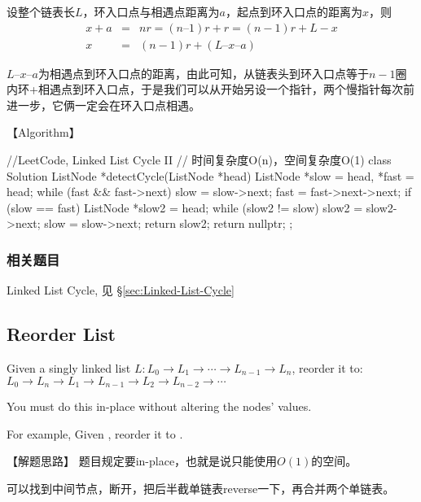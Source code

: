 设整个链表长$L$，环入口点与相遇点距离为$a$，起点到环入口点的距离为$x$，则
\begin{eqnarray}
	x + a &=& nr = (n – 1)r +r = (n-1)r + L - x \nonumber \\
	x &=& (n-1)r + (L – x – a) \nonumber
\end{eqnarray}

$L – x –
a$为相遇点到环入口点的距离，由此可知，从链表头到环入口点等于$n-1$圈内环+相遇点到环入口点，于是我们可以从开始另设一个指针，两个慢指针每次前进一步，它俩一定会在环入口点相遇。

【Algorithm】
\begin{Code}
	//LeetCode, Linked List Cycle II
	// 时间复杂度O(n)，空间复杂度O(1)
	class Solution {
		ListNode *detectCycle(ListNode *head) {
			ListNode *slow = head, *fast = head;
			while (fast && fast->next) {
				slow = slow->next;
				fast = fast->next->next;
				if (slow == fast) {
					ListNode *slow2 = head;
					while (slow2 != slow) {
						slow2 = slow2->next;
						slow = slow->next;
					}
					return slow2;
				}
			}
			return nullptr;
		}
	};
\end{Code}


\subsubsection{相关题目}
\begindot
\item Linked List Cycle, 见 \S \ref{sec:Linked-List-Cycle}
\myenddot


\subsection{Reorder List}
\label{sec:Reorder-List}



Given a singly linked list $L: L_0 \rightarrow L_1 \rightarrow \cdots
\rightarrow L_{n-1} \rightarrow L_n$,
reorder it to: $L_0 \rightarrow L_n \rightarrow L_1 \rightarrow L_{n-1}
\rightarrow L_2 \rightarrow L_{n-2} \rightarrow \cdots$

You must do this in-place without altering the nodes' values.

For example,
Given , reorder it to .


【解题思路】
题目规定要in-place，也就是说只能使用$O(1)$的空间。

可以找到中间节点，断开，把后半截单链表reverse一下，再合并两个单链表。


